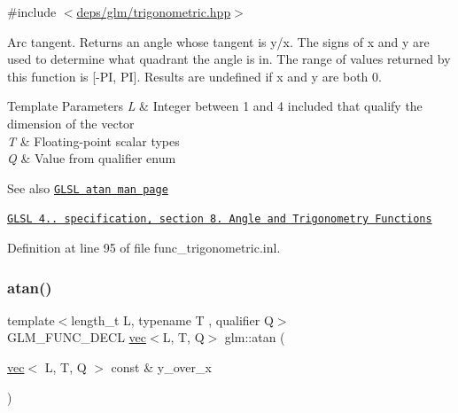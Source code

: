 {\ttfamily \#include $<$\hyperlink{trigonometric_8hpp}{deps/glm/trigonometric.\+hpp}$>$}

Arc tangent. Returns an angle whose tangent is y/x. The signs of x and y are used to determine what quadrant the angle is in. The range of values returned by this function is \mbox{[}-\/\+PI, PI\mbox{]}. Results are undefined if x and y are both 0.


\begin{DoxyTemplParams}{Template Parameters}
{\em L} & Integer between 1 and 4 included that qualify the dimension of the vector \\
\hline
{\em T} & Floating-\/point scalar types \\
\hline
{\em Q} & Value from qualifier enum\\
\hline
\end{DoxyTemplParams}
\begin{DoxySeeAlso}{See also}
\href{http://www.opengl.org/sdk/docs/manglsl/xhtml/atan.xml}{\tt G\+L\+SL atan man page} 

\href{http://www.opengl.org/registry/doc/GLSLangSpec.4.20.8.pdf}{\tt G\+L\+SL 4.. specification, section 8. Angle and Trigonometry Functions} 
\end{DoxySeeAlso}


Definition at line 95 of file func\+\_\+trigonometric.\+inl.

\mbox{\label{group__core__func__trigonometric_ga5229f087eaccbc466f1c609ce3107b95}} 
\subsubsection{\texorpdfstring{atan()}{atan()}\hspace{0.1cm}{\footnotesize\ttfamily [2/2]}}
{\footnotesize\ttfamily template$<$length\+\_\+t L, typename T , qualifier Q$>$ \\
G\+L\+M\+\_\+\+F\+U\+N\+C\+\_\+\+D\+E\+CL \hyperlink{structglm_1_1vec}{vec}$<$L, T, Q$>$ glm\+::atan (\begin{DoxyParamCaption}\item[{\hyperlink{structglm_1_1vec}{vec}$<$ L, T, Q $>$ const \&}]{y\+\_\+over\+\_\+x }\end{DoxyParamCaption})}



